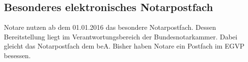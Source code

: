 \subsection{Besonderes elektronisches Notarpostfach}
Notare nutzen ab dem 01.01.2016 das besondere Notarpostfach. Dessen Bereitstellung liegt im Verantwortungsbereich der Bundesnotarkammer. Dabei gleicht das Notarpostfach dem beA. Bisher haben Notare ein Postfach im EGVP besessen. \cite{bea:notarpostfach}